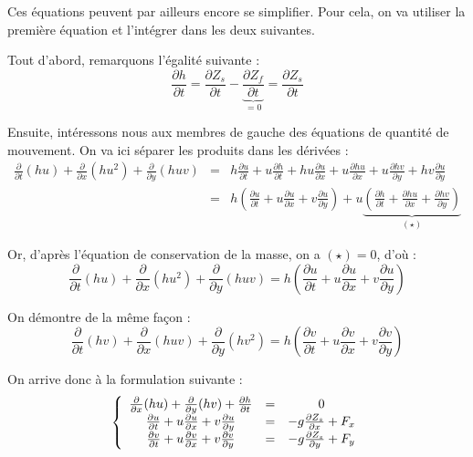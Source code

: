 Ces équations peuvent par ailleurs encore se simplifier. Pour cela, on va utiliser la première équation et l'intégrer dans les deux suivantes.

\bigskip
Tout d'abord, remarquons l'égalité suivante :
\begin{equation} \label{II-2-4-1}
	\frac{\partial h}{\partial t} = \frac{\partial Z_s}{\partial t} - \underbrace{\frac{\partial Z_f}{\partial t}}_{=0} = \frac{\partial Z_s}{\partial t}
\end{equation}

Ensuite, intéressons nous aux membres de gauche des équations de quantité de mouvement. On va ici séparer les produits dans les dérivées :
\begin{eqnarray*}
	\frac{\partial}{\partial t}(hu) + \frac{\partial}{\partial x} (hu^2) + \frac{\partial}{\partial y}(huv) &=& h\frac{\partial u}{\partial t} + u\frac{\partial h}{\partial t} + hu\frac{\partial u}{\partial x} + u\frac{\partial hu}{\partial x} + u\frac{\partial hv}{\partial y} + hv\frac{\partial u}{\partial y} \\
														&=& h\left(\frac{\partial u}{\partial t} + u\frac{\partial u}{\partial x} + v\frac{\partial u}{\partial y} \right) + u\underbrace{\left(\frac{\partial h}{\partial t} + \frac{\partial hu}{\partial x} + \frac{\partial hv}{\partial y} \right)}_{(\star)}
\end{eqnarray*}

Or, d'après l'équation de conservation de la masse, on a $(\star)=0$, d'où :
\[\frac{\partial}{\partial t}(hu) + \frac{\partial}{\partial x} (hu^2) + \frac{\partial}{\partial y}(huv) = h\left(\frac{\partial u}{\partial t} + u\frac{\partial u}{\partial x} + v\frac{\partial u}{\partial y} \right)\]

On démontre de la même façon : 
\[\frac{\partial}{\partial t}(hv) + \frac{\partial}{\partial x} (huv) + \frac{\partial}{\partial y}(hv^2)=h\left( \frac{\partial v}{\partial t} + u\frac{\partial v}{\partial x} + v\frac{\partial v}{\partial y}\right)\]

On arrive donc à la formulation suivante :
\begin{equation} \label{II-2-4-3}
	\left\{ \begin{array}{c c c}
	\frac{\partial}{\partial x} (hu) + \frac{\partial}{\partial y} (hv) + \frac{\partial h}{\partial t} &=& 0 \\
      \frac{\partial u}{\partial t} + u\frac{\partial u}{\partial x} + v\frac{\partial u}{\partial y} &=& -g\frac{\partial Z_s}{\partial x} + F_x\\
	 \frac{\partial v}{\partial t} + u\frac{\partial v}{\partial x} + v\frac{\partial v}{\partial y}&=& -g\frac{\partial Z_s}{\partial y} + F_y
	\end{array}\right.
\end{equation}

